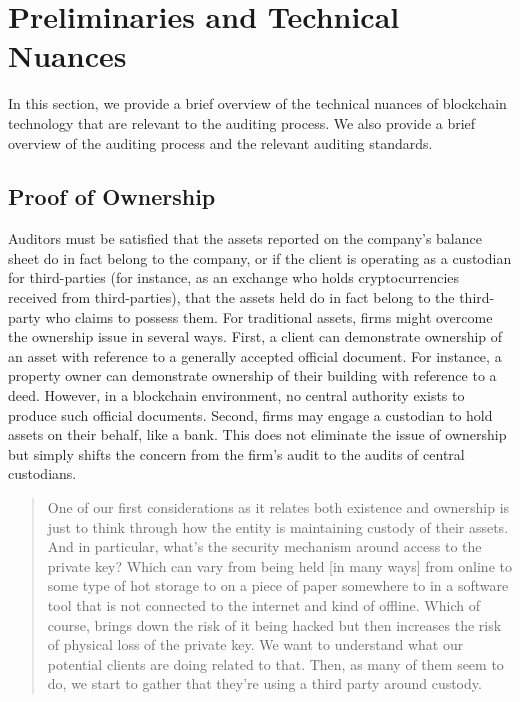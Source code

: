 \section{Preliminaries and Technical Nuances} \label{sec:auditing:framework} %
In this section, we provide a brief overview of the technical nuances of blockchain technology that are relevant to the auditing process. We also provide a brief overview of the auditing process and the relevant auditing standards.


\subsection{Proof of Ownership}\label{sec:auditing:framework:ownership}

Auditors must be satisfied that the assets reported on the company's balance sheet do in fact belong to the company, or if the client is operating as a custodian for third-parties (for instance, as an exchange who holds cryptocurrencies received from third-parties), that the assets held do in fact belong to the third-party who claims to possess them. For traditional assets, firms might overcome the ownership issue in several ways. First, a client can demonstrate ownership of an asset with reference to a generally accepted official document. For instance, a property owner can demonstrate ownership of their building with reference to a deed. However, in a blockchain environment, no central authority exists to produce such official documents. Second, firms may engage a custodian to hold assets on their behalf, like a bank. This does not eliminate the issue of ownership but simply shifts the concern from the firm's audit to the audits of central custodians.

\begin{quote}
One of our first considerations as it relates both existence and ownership is just to think through how the entity is maintaining custody of their assets. And in particular, what's the security mechanism around access to the private key? Which can vary from being held [in many ways] from online to some type of hot storage to on a piece of paper somewhere to in a software tool that is not connected to the internet and kind of offline. Which of course, brings down the risk of it being hacked but then increases the risk of physical loss of the private key. We want to understand what our potential clients are doing related to that. Then, as many of them seem to do, we start to gather that they're using a third party around custody.~\cite{pimentel2021systemizing}
\end{quote}

